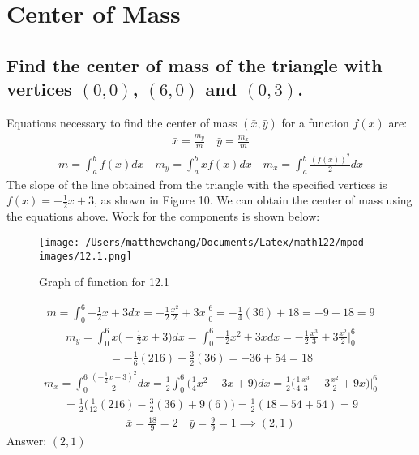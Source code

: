 \documentclass{article}
\begin{document}
\section{Center of Mass}
\subsection{Find the center of mass of the triangle with vertices $(0,0)$, $(6,0)$ and $(0,3)$.}
Equations necessary to find the center of mass $(\bar{x}, \bar{y})$ for a function $f(x)$ are:
\begin{align*}
	\bar{x} = \frac{m_y}{m} \quad \bar{y} = \frac{m_x}{m}
\end{align*}
\begin{align*}
	m = \int_a^b {f(x) dx} \quad m_y = \int_a^b {xf(x) dx} \quad m_x = \int_a^b {\frac{(f(x))^2}{2} dx}
\end{align*}
The slope of the line obtained from the triangle with the specified vertices is $f(x) = -\frac{1}{2}x + 3$, as shown in Figure 10. We can obtain the center of mass using the equations above. Work for the components is shown below:
\begin{figure}
	\centering
	\texttt{[image: /Users/matthewchang/Documents/Latex/math122/mpod-images/12.1.png]}
	\caption{Graph of function for 12.1}
\end{figure}
\begin{align*}
	m = \int_0^6 {-\frac{1}{2}x + 3 dx} = -\frac{1}{2}\frac{x^2}{2} + 3x \bigg|_0^6 = -\frac{1}{4}(36) + 18 = -9 + 18 = 9
\end{align*}
\begin{align*}
	m_y = \int_0^6 {x \bigg( -\frac{1}{2}x + 3 \bigg)dx} = \int_0^6 {-\frac{1}{2}x^2 + 3x dx} = -\frac{1}{2}\frac{x^3}{3} + 3\frac{x^2}{2} \bigg|_0^6
\end{align*}
\begin{align*}
	= -\frac{1}{6} (216) + \frac{3}{2} (36) = -36 + 54 = 18
\end{align*}
\begin{align*}
	m_x = \int_0^6 {\frac{(-\frac{1}{2}x + 3)^2}{2}dx} = \frac{1}{2} \int_0^6 {\bigg( \frac{1}{4}x^2 - 3x + 9 \bigg) dx} = \frac{1}{2} \bigg( \frac{1}{4} \frac{x^3}{3} - 3\frac{x^2}{2} + 9x \bigg) \bigg|_0^6
\end{align*}
\begin{align*}
	= \frac{1}{2} \bigg( \frac{1}{12} (216) - \frac{3}{2} (36) + 9(6) \bigg)= \frac{1}{2} (18 - 54 + 54) = 9
\end{align*}
\begin{align*}
	\bar{x} = \frac{18}{9} = 2 \quad \bar{y} = \frac{9}{9} = 1 \implies (2,1)
\end{align*}
Answer: $(2,1)$
\end{document}
